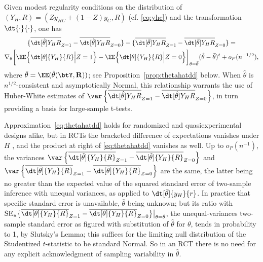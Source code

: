 Given modest regularity conditions on the distribution of
$( Y_{H}, R) = (Z y_{HC} + (1-Z) y_{C}, R)$ (cf. \eqref{eq:yhc})  and the
transformation $\dt{\cdot }{ \cdot}$, one has
\begin{multline}   \label{eq:thetahatdd}
 \{ \overline{\dt[\hat{\theta}]{Y_{H} }{ {R}}}_{Z=1} -
\overline{\dt[\hat{\theta}]{Y_{H} }{ {R}}}_{Z=0} \} -
\{  \overline{\dt[\bar{\theta} ]{ Y_{H} }{ {R}}}_{Z=1} -
\overline{\dt[\bar{\theta}]{ Y_{H} }{ {R}}}_{Z=0}  \}   = \\
\nabla_{\theta} \bigg[ \EE \Big\{
\dt[\theta]{{{Y}_H} }{ {R}}
\Big| Z=1\Big\}   - \EE \Big\{
\dt[\theta]{{{Y}_H} }{ {R}}
\Big| Z=0\Big\} \bigg]_{\theta=\bar\theta}  (\hat\theta - \bar\theta)^{t}  + o_{P}(n^{-1/2}),
\end{multline}
where $\bar\theta = \EE(\hat\theta({\btY}, \mathbf{R}))$;
see Proposition~\ref{prop:thetahatdd} below.   When $\hat\theta$ is
$n^{1/2}$-consistent and asymptotically Normal, this relationship
warrants the use of Huber-White estimates of
$\var\left\{\overline{\dt[\hat{\theta}]{Y_{H} }{ {R}}}_{Z=1} -
\overline{\dt[\hat{\theta}]{Y_{H} }{ {R}}}_{Z=0}\right\}$,
in turn providing a basis for large-sample t-tests.

Approximation~\eqref{eq:thetahatdd} holds for randomized and
quasiexperimental designs alike, but in RCTs the bracketed difference
of expectations vanishes under $H$
\citep{bowers:hans:2008,lin2013agnostic,lin2013agnosticSupp}, and the
product at right of \eqref{eq:thetahatdd} vanishes as well. Up to
$o_{P}(n^{-1})$, the variances
$\var \left\{ \overline{\dt[\hat\theta]{{Y_H} }{ R}}_{Z=1} -
  \overline{\dt[\hat\theta]{{Y_H}}{ R}}_{Z=0} \right\} $
and
$\var \left\{ \overline{\dt[\bar\theta]{{Y_H} }{ R}}_{Z=1} -
  \overline{\dt[\bar\theta]{{Y_H}}{ R}}_{Z=0} \right\}$
are the same, the latter being no greater than the expected value of
the squared standard error of two-sample inference with unequal
variances, as applied to
$\dt[\bar\theta]{{y_H} }{ r}$.  In practice that specific standard error
is unavailable, $\bar\theta$ being unknown; but its ratio with
$\mathrm{SE}_{u}\big\{ \overline{\dt[\theta]{{Y_H} }{ R}}_{Z=1} -
\overline{\dt[\theta]{{Y_H}}{ R}}_{Z=0} \big\} \big|_{\theta =
  \hat{\theta}}$, the unequal-variances two-sample standard error as figured with
substitution of $\hat\theta$ for $\theta$, tends in probability to 1,
by Slutsky's Lemma;
this suffices for the limiting null
distribution of the Studentized $t$-statistic to be standard Normal.
So in an RCT there is no need for any
explicit acknowledgment of sampling variability in $\hat\theta$.

